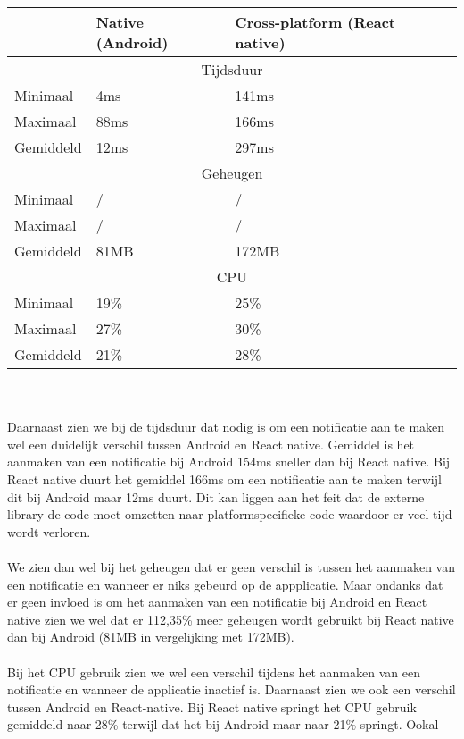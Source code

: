 \begin{tabular}{ |p{3cm}||p{5cm}|p{5cm}| }
    \hline
     & Native (Android) & Cross-platform (React native) \\
    \hline
    \multicolumn{3}{|c|}{Tijdsduur} \\
    \hline
    Minimaal & 4ms & 141ms \\
    Maximaal & 88ms & 166ms \\
    Gemiddeld & 12ms & 297ms \\
    \hline
    \multicolumn{3}{|c|}{Geheugen} \\ 
    \hline
    Minimaal & / & / \\
    Maximaal & / & / \\
    Gemiddeld & 81MB & 172MB \\
    \hline
    \multicolumn{3}{|c|}{CPU} \\
    \hline
    Minimaal & 19\% & 25\% \\
    Maximaal & 27\% & 30\% \\
    Gemiddeld & 21\% & 28\% \\
    \hline
\end{tabular}
\\\\
Daarnaast zien we bij de tijdsduur dat nodig is om een notificatie aan te maken wel een duidelijk 
verschil tussen Android en React native. Gemiddel is het aanmaken van een notificatie bij Android
154ms sneller dan bij React native. Bij React native duurt het gemiddel 166ms om een notificatie 
aan te maken terwijl dit bij Android maar 12ms duurt. Dit kan liggen aan het feit dat de externe 
library de code moet omzetten naar platformspecifieke code waardoor er veel tijd wordt verloren.
\\\\
We zien dan wel bij het geheugen dat er geen verschil is tussen het aanmaken van een notificatie en wanneer er 
niks gebeurd op de appplicatie. Maar ondanks dat er geen invloed is om het aanmaken van een notificatie bij 
Android en React native zien we wel dat er 112,35\% meer geheugen wordt gebruikt bij React native dan 
bij Android (81MB in vergelijking met 172MB). 
\\\\
Bij het CPU gebruik zien we wel een verschil tijdens het aanmaken van een notificatie en wanneer de 
applicatie inactief is. Daarnaast zien we ook een verschil tussen Android en React-native. Bij React native 
springt het CPU gebruik gemiddeld naar 28\% terwijl dat het bij Android maar naar 21\% springt. Ookal 
